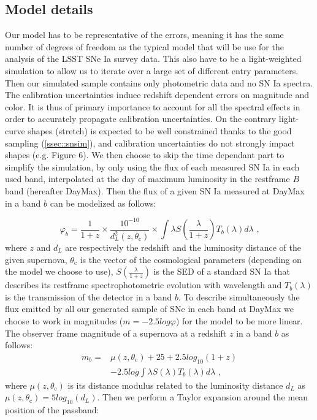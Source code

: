 \documentclass[\docopts]{\docclass}
\begin{document}
\subsection{Model details}
\label{subsec::model_details}
Our model has to be representative of the errors, meaning it has the same number of degrees of freedom as the typical model that will be use for the analysis of the LSST SNe Ia survey data.
This also have to be a light-weighted simulation to allow us to iterate over a large set of different entry parameters.
Then our simulated sample contains only photometric data and no SN Ia spectra.
The calibration uncertainties induce redshift dependent errors on magnitude and color.
It is thus of primary importance to account for all the spectral effects in order to accurately propagate calibration uncertainties.
On the contrary light-curve shapes (stretch) is expected to be well constrained thanks to the good sampling (\ref{ssec::snsim}), and calibration uncertainties do not strongly impact shapes (e.g. \cite{1401.4064} Figure 6).
We then choose to skip the time dependant part to simplify the simulation, by only using the flux of each measured SN Ia in each used band, interpolated at the day of maximum luminosity in the restframe $B$ band (hereafter DayMax).
Then the flux of a given SN Ia measured at DayMax in a band $b$ can be modelized as follows:

\begin{equation}
  \varphi_b = \frac{1}{1+z} \times \frac{10^{-10}}{d_L^2(z, \theta_\text{c})}\times \int \lambda S(\frac{\lambda}{1+z}) T_b(\lambda) d\lambda \text{ ,}
\end{equation}
where $z$ and $d_L$ are respectively the redshift and the luminosity distance of the given supernova,
$\theta_\text{c}$ is the vector of the cosmological parameters (depending on the model we choose to use),
$S(\frac{\lambda}{1+z})$ is the SED of a standard SN Ia that describes its restframe spectrophotometric evolution with wavelength
and $T_b(\lambda)$ is the transmission of the detector in a band $b$.
To describe simultaneously the flux emitted by all our generated sample of SNe in each band at DayMax we choose to work in magnitudes ($m=-2.5 log\varphi$) for the model to be more linear.
The observer frame magnitude of a supernova at a redshift $z$ in a band $b$ as follows:
\begin{equation}
\begin{split}
\label{eq::raw_model}
m_b = &\mu(z, \theta_\text{c}) + 25 + 2.5log_{10}(1+z) \\
&- 2.5log\int \lambda S(\lambda) T_b(\lambda) d\lambda \text{ ,}
\end{split}
\end{equation}
where $\mu(z, \theta_\text{c})$ is its distance modulus related to the luminosity distance $d_L$ as $\mu(z, \theta_\text{c}) = 5log_{10}(d_L)$.
Then we perform a Taylor expansion around the mean position of the passband:
\end{document}
